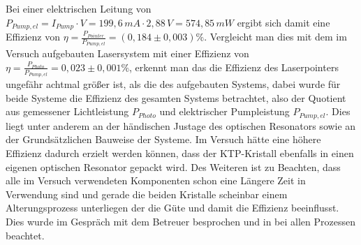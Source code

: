 \documentclass[twoside,colorback,accentcolor=tud4c,11pt]{tudreport}
\begin{document}
Bei einer elektrischen Leitung von $P_{Pump,el}=I_{Pump}\cdot V=199,6\,\si{mA}\cdot 2,88\,\si{V}=574,85\,\si{mW}$ ergibt sich damit eine Effizienz von $\eta=\frac{P_{Pointer}}{P_{Pump,el}}=(0,184\pm 0,003) \%$. Vergleicht man dies mit dem im Versuch aufgebauten Lasersystem mit einer Effizienz von $\eta=\frac{P_{Photo}}{P_{Pump,el}}=0,023\pm0,001 \%$, erkennt man das die Effizienz des Laserpointers ungefähr achtmal größer ist, als die des aufgebauten Systems, dabei wurde für beide Systeme die Effizienz des gesamten Systems betrachtet, also der Quotient aus gemessener Lichtleistung $P_{Photo}$ und elektrischer Pumpleistung $P_{Pump,el}$. Dies liegt unter anderem an der händischen Justage des optischen Resonators sowie an der Grundsätzlichen Bauweise der Systeme. Im Versuch hätte eine höhere Effizienz dadurch erzielt werden können, dass der KTP-Kristall ebenfalls in einen eigenen optischen Resonator gepackt wird. Des Weiteren ist zu Beachten, dass alle im Versuch verwendeten Komponenten schon eine Längere Zeit in Verwendung sind und gerade die beiden Kristalle scheinbar einem Alterungsprozess unterliegen der die Güte und damit die Effizienz beeinflusst. Dies wurde im Gespräch mit dem Betreuer besprochen und in bei allen Prozessen beachtet.
\end{document}
